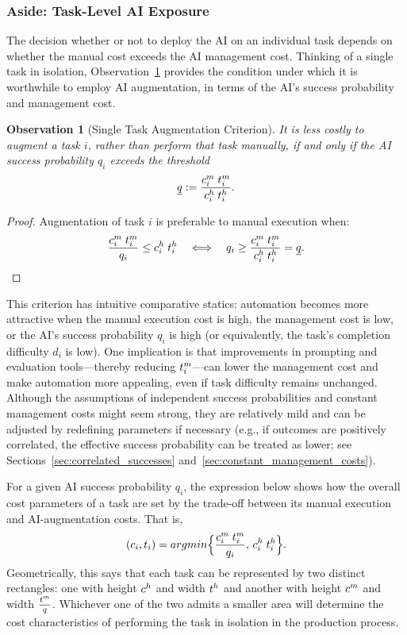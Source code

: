 \documentclass{article}
\theoremstyle{plain}
\theoremstyle{plain}
\newtheorem{observation}{Observation}
\begin{document}
\subsubsection{Aside: Task-Level AI Exposure}

The decision whether or not to deploy the AI on an individual task depends on whether the manual cost exceeds the AI management cost.  Thinking of a single task in isolation, Observation~\ref{obs:single} provides the condition under which it is worthwhile to employ AI augmentation, in terms of the AI's success probability and management cost.

\begin{observation}[Single Task Augmentation Criterion] 
\label{obs:single}
It is less costly to augment a task $i$, rather than perform that task manually, if and only if the AI success probability $q_i$ exceeds the threshold
$$\underline{q} := \frac{c^{m}_{i} \; t^{m}_{i}}{c^{h}_{i} \; t^{h}_{i}}.$$
\end{observation}
\begin{proof}
Augmentation of task $i$ is preferable to manual execution when:
$$\frac{c^{m}_{i} \; t^{m}_{i}}{q_i} \leq c^{h}_{i} \; t^{h}_{i} \quad \Longleftrightarrow \quad q_i \geq \frac{c^{m}_{i} \; t^{m}_{i}}{c^{h}_{i} \; t^{h}_{i}} = \underline{q}.$$
\end{proof}

This criterion has intuitive comparative statics: automation becomes more attractive when the manual execution cost is high, the management cost is low, or the AI's success probability $q_i$ is high (or equivalently, the task's completion difficulty $d_i$ is low).
One implication is that improvements in prompting and evaluation tools---thereby reducing $t^{m}_{i}$---can lower the management cost and make automation more appealing, even if task difficulty remains unchanged.
Although the assumptions of independent success probabilities and constant management costs might seem strong, they are relatively mild and can be adjusted by redefining parameters if necessary (e.g., if outcomes are positively correlated, the effective success probability can be treated as lower; see Sections~\ref{sec:correlated_successes} and~\ref{sec:constant_management_costs}).

For a given AI success probability $q_i$, the expression below shows how the overall cost parameters of a task are set by the trade-off between its manual execution and AI-augmentation costs.  That is,
$$(c_{i}, t_{i}) = argmin \Bigl\{\frac{c^{m}_{i} \; t^{m}_{i}}{q_i},\, c^{h}_{i} \; t^{h}_{i}\Bigr\}.$$
Geometrically, this says that each task can be represented by two distinct rectangles: one with height $c^{h}_{}$ and width $t^{h}_{}$ and another with height $c^{m}_{}$ and width $\frac{t^{m}_{}}{q}$.
Whichever one of the two admits a smaller area will determine the cost characteristics of performing the task in isolation in the production process.
\end{document}
